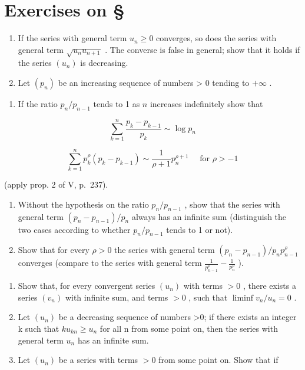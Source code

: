 \section*{Exercises on \S{}}
{}

\begin{enumerate}
\def\labelenumi{\arabic{enumi})}
\item
  If the series with general term \(u_{n} \geqslant 0\) converges, so does the series with general term \(\sqrt{u_n u_{n+1}}\) . The converse is false in general; show that it holds if the series \((u_n)\) is decreasing.
\item
  Let \((p_{n})\) be an increasing sequence of numbers \textgreater{} 0 tending to \(+\infty\) .
\end{enumerate}

\begin{enumerate}
\def\labelenumi{\alph{enumi})}
\tightlist
\item
  If the ratio \(p_n / p_{n-1}\) tends to 1 as \(n\) increases indefinitely show that
\end{enumerate}

\[
\sum_ {k = 1} ^ {n} \frac {p _ {k} - p _ {k - 1}}{p _ {k}} \sim \log p _ {n}
\]

\[
\sum_ {k = 1} ^ {n} p _ {k} ^ {\rho} (p _ {k} - p _ {k - 1}) \sim \frac {1}{\rho + 1} p _ {n} ^ {\rho + 1} \quad \text { for } \rho > - 1
\]

(apply prop. 2 of V, p.~237).

\begin{enumerate}
\def\labelenumi{\alph{enumi})}
\setcounter{enumi}{1}
\item
  Without the hypothesis on the ratio \(p_{n}/p_{n-1}\) , show that the series with general term \((p_{n}-p_{n-1})/p_{n}\) always has an infinite sum (distinguish the two cases according to whether \(p_{n}/p_{n-1}\) tends to 1 or not).
\item
  Show that for every \(\rho > 0\) the series with general term \((p_n - p_{n-1}) / p_n p_{n-1}^\rho\) converges (compare to the series with general term \(\frac{1}{p_{n-1}^\rho} - \frac{1}{p_n^\rho}\) ).
\end{enumerate}

\begin{enumerate}
\def\labelenumi{\arabic{enumi})}
\setcounter{enumi}{2}
\item
  Show that, for every convergent series \((u_{n})\) with terms \(>0\) , there exists a series \((v_{n})\) with infinite sum, and terms \(>0\) , such that \(\liminf v_n / u_n = 0\) .
\item
  Let \((u_{n})\) be a decreasing sequence of numbers \textgreater0; if there exists an integer k such that \(ku_{kn} \geqslant u_{n}\) for all n from some point on, then the series with general term \(u_{n}\) has an infinite sum.
\item
  Let \((u_{n})\) be a series with terms \(>0\) from some point on. Show that if
\end{enumerate}

